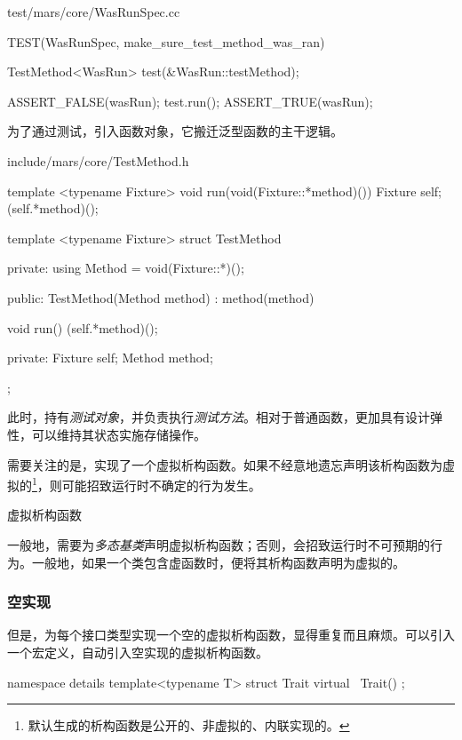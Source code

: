 \begin{content}
\begin{diff}{test/mars/core/WasRunSpec.cc}
\begin{minicpp}
TEST(WasRunSpec, make_sure_test_method_was_ran) {
  TestMethod<WasRun> test(&WasRun::testMethod);

  ASSERT_FALSE(wasRun);
  test.run();
  ASSERT_TRUE(wasRun);
}
\end{minicpp}
\end{diff}

为了通过测试，引入函数对象，它搬迁泛型函数的主干逻辑。

\begin{diff}{include/mars/core/TestMethod.h}
\begin{minicpp}
template <typename Fixture>
void run(void(Fixture::*method)()) {
  Fixture self;
  (self.*method)();
}
\end{minicpp}
\tcblower
\begin{minicpp}
template <typename Fixture>
struct TestMethod {
private:
  using Method = void(Fixture::*)();

public:
  TestMethod(Method method)
    : method(method) {
  }

  void run() {
    (self.*method)();
  }

private:
  Fixture self;
  Method method;
};
\end{minicpp}
\end{diff}

此时，持有\emph{测试对象}，并负责执行\emph{测试方法}。相对于普通函数，更加具有设计弹性，可以维持其状态实施存储操作。


需要关注的是，实现了一个虚拟析构函数。如果不经意地遗忘声明该析构函数为虚拟的\footnote{默认生成的析构函数是公开的、非虚拟的、内联实现的。}，则可能招致运行时不确定的行为发生。

\begin{episode}{虚拟析构函数}
\begin{content}

一般地，需要为\emph{多态基类}声明虚拟析构函数；否则，会招致运行时不可预期的行为。一般地，如果一个类包含虚函数时，便将其析构函数声明为虚拟的。

\subsubsection{空实现}

但是，为每个接口类型实现一个空的虚拟析构函数，显得重复而且麻烦。可以引入一个宏定义，自动引入空实现的虚拟析构函数。

 \begin{c++}
namespace details {
  template<typename T>
  struct Trait {
    virtual ~Trait() {}
  };
}


\end{c++}
\end{content}
\end{episode}
\end{content}
